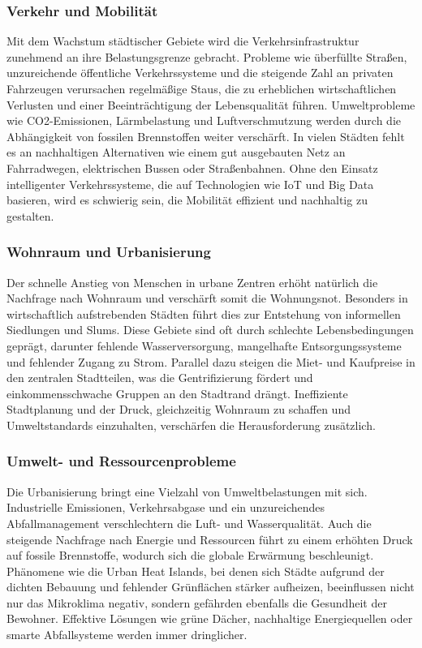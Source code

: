 \documentclass[conference,compsoc,final,a4paper, onecolumn, 11pt]{IEEEtran}
\begin{document}
\subsubsection{Verkehr und Mobilität}
Mit dem Wachstum städtischer Gebiete wird die Verkehrsinfrastruktur zunehmend an ihre Belastungsgrenze gebracht. 
Probleme wie überfüllte Straßen, unzureichende öffentliche Verkehrssysteme und die steigende Zahl an privaten Fahrzeugen verursachen regelmäßige Staus, die zu erheblichen wirtschaftlichen Verlusten und einer Beeinträchtigung der Lebensqualität führen.
Umweltprobleme wie CO2-Emissionen, Lärmbelastung und Luftverschmutzung werden durch die Abhängigkeit von fossilen Brennstoffen weiter verschärft.
In vielen Städten fehlt es an nachhaltigen Alternativen wie einem gut ausgebauten Netz an Fahrradwegen, elektrischen Bussen oder Straßenbahnen. 
Ohne den Einsatz intelligenter Verkehrssysteme, die auf Technologien wie \ac{IoT} und Big Data basieren, wird es schwierig sein, die Mobilität effizient und nachhaltig zu gestalten. \autocite{mckinsey_global_institute_smart_2021}


\subsubsection{Wohnraum und Urbanisierung}
Der schnelle Anstieg von Menschen in urbane Zentren erhöht natürlich die Nachfrage nach Wohnraum und verschärft somit die Wohnungsnot. 
Besonders in wirtschaftlich aufstrebenden Städten führt dies zur Entstehung von informellen Siedlungen und Slums.
Diese Gebiete sind oft durch schlechte Lebensbedingungen geprägt, darunter fehlende Wasserversorgung, mangelhafte Entsorgungssysteme und fehlender Zugang zu Strom.
Parallel dazu steigen die Miet- und Kaufpreise in den zentralen Stadtteilen, was die Gentrifizierung fördert und einkommensschwache Gruppen an den Stadtrand drängt.
Ineffiziente Stadtplanung und der Druck, gleichzeitig Wohnraum zu schaffen und Umweltstandards einzuhalten, verschärfen die Herausforderung zusätzlich. \autocite{un_habitat_world_2022}


\subsubsection{Umwelt- und Ressourcenprobleme}
Die Urbanisierung bringt eine Vielzahl von Umweltbelastungen mit sich. 
Industrielle Emissionen, Verkehrsabgase und ein unzureichendes Abfallmanagement verschlechtern die Luft- und Wasserqualität. 
Auch die steigende Nachfrage nach Energie und Ressourcen führt zu einem erhöhten Druck auf fossile Brennstoffe, wodurch sich die globale Erwärmung beschleunigt.
Phänomene wie die Urban Heat Islands, bei denen sich Städte aufgrund der dichten Bebauung und fehlender Grünflächen stärker aufheizen, beeinflussen nicht nur  das Mikroklima negativ, sondern gefährden  ebenfalls die Gesundheit der Bewohner.
Effektive Lösungen wie grüne Dächer, nachhaltige Energiequellen oder smarte Abfallsysteme werden immer dringlicher. \autocite{sensors_smart_2015}
\end{document}
